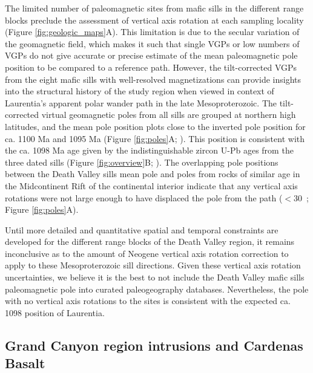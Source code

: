 \documentclass[draft]{agujournal2019}
\begin{document}
The limited number of paleomagnetic sites from mafic sills in the different range blocks preclude the assessment of vertical axis rotation at each sampling locality (Figure \ref{fig:geologic_maps}A). This limitation is due to the secular variation of the geomagnetic field, which makes it such that single VGPs or low numbers of VGPs do not give accurate or precise estimate of the mean paleomagnetic pole position to be compared to a reference path. However, the tilt-corrected VGPs from the eight mafic sills with well-resolved magnetizations can provide insights into the structural history of the study region when viewed in context of Laurentia's apparent polar wander path in the late Mesoproterozoic. The tilt-corrected virtual geomagnetic poles from all sills are grouped at northern high latitudes, and the mean pole position plots close to the inverted pole position for ca. 1100 Ma and 1095 Ma (Figure \ref{fig:poles}A; ). This position is consistent with the ca. 1098 Ma age given by the indistinguishable zircon U-Pb ages from the three dated sills (Figure \ref{fig:overview}B; ). The overlapping pole positions between the Death Valley sills mean pole and poles from rocks of similar age in the Midcontinent Rift of the continental interior indicate that any vertical axis rotations were not large enough to have displaced the pole from the path ($<$30\textdegree\ ; Figure \ref{fig:poles}A).

Until more detailed and quantitative spatial and temporal constraints are developed for the different range blocks of the Death Valley region, it remains inconclusive as to the amount of Neogene vertical axis rotation correction to apply to these Mesoproterozoic sill directions. Given these vertical axis rotation uncertainties, we believe it is the best to not include the Death Valley mafic sills paleomagnetic pole into curated paleogeography databases. Nevertheless, the pole with no vertical axis rotations to the sites is consistent with the expected ca. 1098 position of Laurentia.

\subsection*{Grand Canyon region intrusions and Cardenas Basalt}
\end{document}
